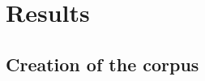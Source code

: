 \chapter{Results} %
\label{cha:results}

\section{Creation of the corpus} %
\label{sec:creation_of_the_corpus_results}




